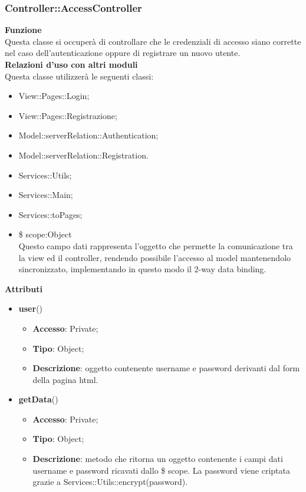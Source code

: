 {\subsubsection{Controller::AccessController}{
	\label{sub:AccessController}
	\textbf{Funzione}\\
		\indent Questa classe si occuperà di controllare che le credenziali di accesso siano corrette nel caso dell'autenticazione oppure di registrare un nuovo utente.\\
	\textbf{Relazioni d'uso con altri moduli}\\
		\indent Questa classe utilizzerà le seguenti classi:
	\begin{itemize}
		\item View::Pages::Login;
		\item View::Pages::Registrazione;
		\item Model::\-serverRelation::\-Authentication;
		\item Model::\-serverRelation::\-Registration.
		\item Services::Utils;
		\item Services::Main;
		\item Services::toPages;
		\item \$ scope:Object\\
    		\indent Questo campo dati rappresenta l’oggetto che permette la comunicazione tra la view ed il controller, rendendo possibile l’accesso al model mantenendolo sincronizzato, implementando in questo modo il 2-way data binding.
	\end{itemize}
	\textbf{Attributi}\\
    \begin{itemize}
    	\item \textbf{user}()
		\begin{itemize}
			\item \textbf{Accesso}: Private;
			\item \textbf{Tipo}: Object;
			\item \textbf{Descrizione}: oggetto contenente username e password derivanti dal form della pagina html.
		\end{itemize}
    	\item \textbf{getData}()
		\begin{itemize}
			\item \textbf{Accesso}: Private;
			\item \textbf{Tipo}: Object;
			\item \textbf{Descrizione}: metodo che ritorna un oggetto contenente i campi dati username e password ricavati dallo \$ scope. La password viene criptata grazie a Services::\-Utils::\-encrypt(password).

\end{itemize}
\end{itemize}}}
